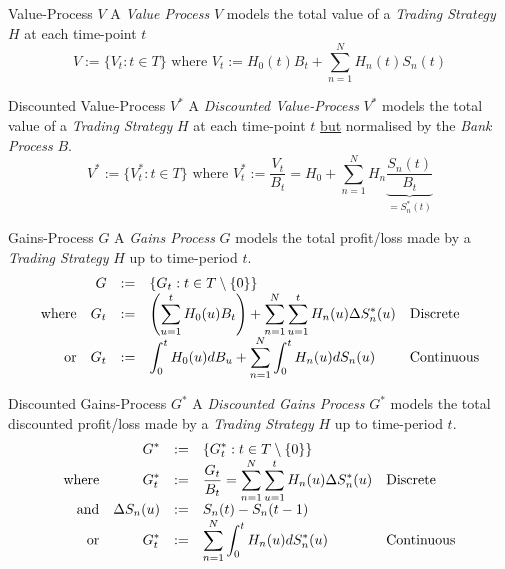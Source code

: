 \documentclass[11pt,a4paper]{article}
\begin{document}
  \begin{definition}{Value-Process $V$}\label{def_value_process}
    A \textit{Value Process} $V$ models the total value of a \textit{Trading Strategy} $H$ at each time-point $t$
    \[ V:=\{V_t:t\in T\}\text{ where }V_t:=H_0(t)B_t+\sum_{n=1}^NH_n(t)S_n(t) \]
  \end{definition}

  \begin{definition}{Discounted Value-Process $V^*$}\label{def_discounted_value_process}
    A \textit{Discounted Value-Process} $V^*$ models the total value of a \textit{Trading Strategy} $H$ at each time-point $t$ \underline{but} normalised by the \textit{Bank Process} $B$.
    \[ V^*:=\{V_t^*:t\in T\}\text{ where }V_t^*:=\frac{V_t}{B_t}=H_0+\sum_{n=1}^NH_n\underbrace{\frac{S_n(t)}{B_t}}_{=S_n^*(t)} \]
  \end{definition}

  \begin{definition}{Gains-Process $G$}\label{def_gains_process}
    A \textit{Gains Process} $G$ models the total profit/loss made by a \textit{Trading Strategy} $H$ up to time-period $t$.
    \[\everymath={\displaystyle}\begin{array}{rrcll}
      &G&:=&\{G_t:t\in T\setminus\{0\}\}\\
      \text{where}&G_t&:=&\left(\sum_{u=1}^tH_0(u)B_t\right)+\sum_{n=1}^N\sum_{u=1}^tH_n(u)\Delta S_n^*(u)&\text{Discrete}\\
      \text{or}&G_t&:=&\int_0^tH_0(u)dB_u+\sum_{n=1}^N\int_0^tH_n(u)dS_n(u)&\text{Continuous}
    \end{array}\]
  \end{definition}

  \begin{definition}{Discounted Gains-Process $G^*$}\label{def_discounted_gains_process}
    A \textit{Discounted Gains Process} $G^*$ models the total discounted profit/loss made by a \textit{Trading Strategy} $H$ up to time-period $t$.
    \[\everymath={\displaystyle}\begin{array}{rrcll}
      &G^*&:=&\{G_t^*:t\in T\setminus\{0\}\}\\
      \text{where}&G_t^*&:=&\frac{G_t}{B_t}=\sum_{n=1}^N\sum_{u=1}^tH_n(u)\Delta S_n^*(u)&\text{Discrete}\\
      \text{and}&\Delta S_n(u)&:=&S_n(t)-S_n(t-1)\\
      \text{or}&G_t^*&:=&\sum_{n=1}^N\int_0^tH_n(u)dS_n^*(u)&\text{Continuous}
    \end{array}\]
  \end{definition}
\end{document}
